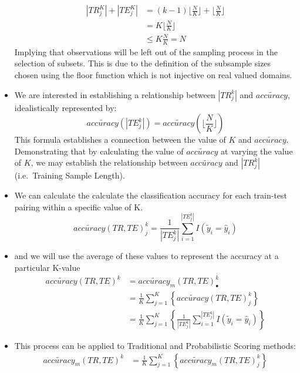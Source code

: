 \documentclass[12pt,]{article}
\begin{document}
\begin{itemize}
  \begin{align*}
  |TR_{j}^{K}| + |TE_{j}^{K}| &= (k-1)\Big \lfloor \frac{N}{K} \Big \rfloor + \Big \lfloor \frac{N}{K} \Big \rfloor \\[0.5em]
  &= K \Big \lfloor \frac{N}{K} \Big \rfloor \\[0.5em]
  &\leq K \frac{N}{K} = N
  \end{align*} Implying that observations will be left out of the
  sampling process in the selection of subsets. This is due to the
  definition of the subsample sizes chosen using the floor function
  which is not injective on real valued domains.\\
\item
  We are interested in establishing a relationship between
  \(|TR_{j}^{k}|\) and \(\tilde{accuracy}\), idealistically represented
  by: \[
  \tilde{accuracy}\left( |TE_{j}^{k}|  \right) = \tilde{accuracy}\left( \Big \lfloor \frac{N}{K} \Big \rfloor  \right) \tag{EQ-XX} 
  \] This formula establishes a connection between the value of \(K\)
  and \(\tilde{accuracy}\). Demonstrating that by calculating the value
  of \(\tilde{accuracy}\) at varying the value of \(K\), we may
  establish the relationship between \(\tilde{accuracy}\) and
  \(|TR_{j}^{k}|\) (i.e.~Training Sample Length).
\item
  We can calculate the calculate the classification accuracy for each
  train-test pairing within a specific value of K.
  \[\tilde{accuracy}\left(TR, TE \right)_{j}^{k}= \frac{1}{|TE_{j}^{k}|} \sum_{i=1}^{|TE_{j}^{k}|} I\left(\tilde{y}_{i}=\hat{y}_{i} \right) \]
\item
  and we will use the average of these values to represent the accuracy
  at a particular K-value \begin{align*}
    \tilde{accuracy}\left(TR, TE \right)^{k} &= \tilde{accuracy}_{m}\left(TR, TE \right)_{\bullet}^{k} \\
    &=\frac{1}{K}\sum_{j=1}^{K} \left \{ \tilde{accuracy}\left(TR, TE \right)_{j}^{k}\right \} \\
    &=  \frac{1}{K}\sum_{j=1}^{K} \left \{ \frac{1}{|TE_{j}^{k}|} \sum_{i=1}^{|TE_{j}^{k}|} I\left(\tilde{y}_{i}=\hat{y}_{i} \right) \right \}
  \end{align*}
\item
  This process can be applied to Traditional and Probabilistic Scoring
  methods: \begin{align*}
    \tilde{accuracy}_{m}\left(TR, TE \right)^{k} &= \frac{1}{K}\sum_{j=1}^{K} \left \{ \tilde{accuracy}_{m}\left(TR, TE \right)_{j}^{k}\right \} \\

\end{align*}
\end{itemize}
\end{document}

